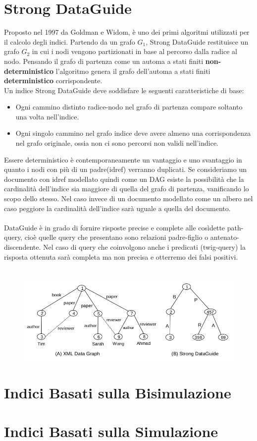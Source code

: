 \section{Strong DataGuide}
Proposto nel 1997 da Goldman e Widom, è uno dei primi algoritmi utilizzati per il calcolo degli indici. Partendo da un grafo $G_1$, Strong DataGuide restituisce un grafo $G_2$ in cui i nodi vengono partizionati in base al percorso dalla radice al nodo. Pensando il grafo di partenza come un automa a stati finiti \textbf{non-deterministico} l'algoritmo genera il grafo dell'automa a stati finiti \textbf{deterministico} corrispondente.\\
Un indice Strong DataGuide deve soddisfare le seguenti caratteristiche di base:
\begin{itemize}
\item Ogni cammino distinto radice-nodo nel grafo di partenza compare soltanto una volta nell'indice.
\item Ogni singolo cammino nel grafo indice deve avere almeno una corrispondenza nel grafo originale, ossia non ci sono percorsi non validi nell'indice.
\end{itemize}
Essere deterministico è contemporaneamente un vantaggio e uno svantaggio in quanto i nodi con più di un padre(idref) verranno duplicati. Se consideriamo un documento con idref modellato quindi come un DAG esiste la possibilità che la cardinalità dell'indice sia maggiore di quella del grafo di partenza, vanificando lo scopo dello stesso. Nel caso invece di un documento modellato come un albero nel caso peggiore la cardinalità dell'indice sarà uguale a quella del documento.\\\\
DataGuide è in grado di fornire risposte precise e complete alle cosìdette path-query, cioè quelle query che presentano sono relazioni padre-figlio o antenato-discendente. Nel caso di query che coinvolgono anche i predicati (twig-query) la risposta ottenuta sarà completa ma non precisa e otterremo dei falsi positivi.\\\\
\begin{example}
\begin{figure}[H]
\includegraphics[scale=.5]{dataguide}
\end{figure}
\end{example}
\section{Indici Basati sulla Bisimulazione}
\section{Indici Basati sulla Simulazione}